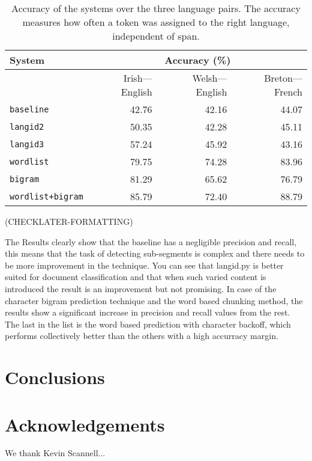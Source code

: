 \documentclass[11pt]{article}
\begin{document}
\begin{table}
\begin{center}
\begin{tabular}{|l|r|r|r|}
\hline
\textbf{System} &  \multicolumn{3}{c|}{\textbf{Accuracy} (\%)} \\
\hline
       &   Irish---English & Welsh---English & Breton---French \\ 
\hline
\texttt{baseline} & 42.76 & 42.16 & 44.07 \\
\hline
\texttt{langid2} & 50.35 & 42.28 & 45.11  \\
\hline
\texttt{langid3} & 57.24 & 45.92 & 43.16 \\
\hline
\texttt{wordlist} & 79.75 & 74.28 & 83.96 \\
\hline
\texttt{bigram} & 81.29 & 65.62 & 76.79 \\
\hline
\texttt{wordlist+bigram} & 85.79 & 72.40 & 88.79 \\
\hline
\end{tabular}
\end{center}
\label{table:accuracy}
\caption{Accuracy of the systems over the three language pairs. The accuracy measures how often a token
  was assigned to the right language, independent of span.}
\end{table}


(CHECKLATER-FORMATTING)

The Results clearly show that the baseline has a negligible precision and recall, this means that the task of detecting sub-segments is complex and there needs to be more improvement in the technique. You can see that langid.py is better suited for document classification and that when such varied content is introduced the result is an improvement but not promising. In case of the character bigram prediction technique and the word based chunking method, the results show a significant increase in precision and recall values from the rest. The last in the list is the word based prediction with character backoff, which performs collectively better than the others with a high accurracy margin. \\


\section{Conclusions}
\label{sec:conclusions}

\section*{Acknowledgements}

We thank Kevin Scannell... 



\end{document}
